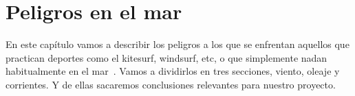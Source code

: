 \chapter{Peligros en el mar}

En este capítulo vamos a describir los peligros a los que se enfrentan
aquellos que practican deportes como el kitesurf, windsurf, etc, o que
simplemente nadan habitualmente en el mar~\cite{FBVELA}. Vamos a
dividirlos en tres secciones, viento, oleaje y corrientes. Y de ellas
sacaremos conclusiones relevantes para nuestro proyecto.





